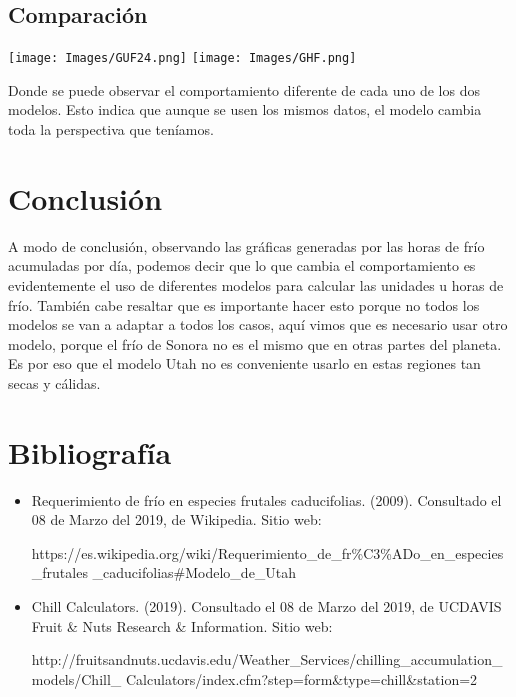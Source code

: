 \documentclass{article}
\begin{document}
\subsection{Comparación}
\begin{center}
    \texttt{[image: Images/GUF24.png]}
    \texttt{[image: Images/GHF.png]}
\end{center}
Donde se puede observar el comportamiento diferente de cada uno de los dos modelos. Esto indica que aunque se usen los mismos datos, el modelo cambia toda la perspectiva que teníamos.
\section{Conclusión}
A modo de conclusión, observando las gráficas generadas por las horas de frío acumuladas por día, podemos decir que lo que cambia el comportamiento es evidentemente el uso de diferentes modelos para calcular las unidades u horas de frío. También cabe resaltar que es importante hacer esto porque no todos los modelos se van a adaptar a todos los casos, aquí vimos que es necesario usar otro modelo, porque el frío de Sonora no es el mismo que en otras partes del planeta. Es por eso que el modelo Utah no es conveniente usarlo en estas regiones tan secas y cálidas.

\section{Bibliografía}

\begin{itemize}
    \item Requerimiento de frío en especies frutales caducifolias. (2009). Consultado el 08 de Marzo del 2019, de Wikipedia. Sitio web: 
    
    https://es.wikipedia.org/wiki/Requerimiento\_de\_fr\%C3\%ADo\_en\_especies\_frutales
    \_caducifolias\#Modelo\_de\_Utah
    
    \item Chill Calculators. (2019). Consultado el 08 de Marzo del 2019, de UCDAVIS Fruit \& Nuts Research \& Information. Sitio web:
    
    http://fruitsandnuts.ucdavis.edu/Weather\_Services/chilling\_accumulation\_models/Chill\_
    Calculators/index.cfm?step=form&type=chill&station=2
    
    
\end{itemize}
\end{document}
